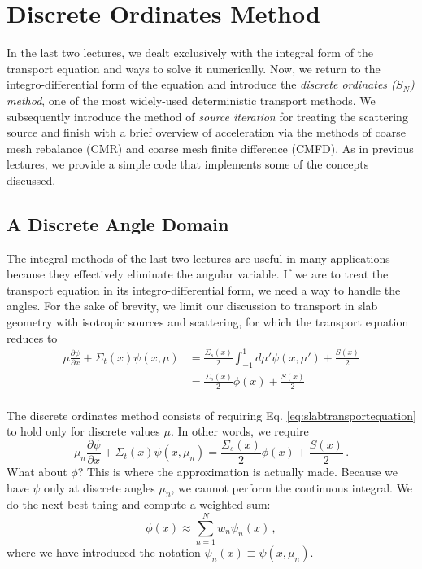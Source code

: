 \chapter{Discrete Ordinates Method}
\label{lec:discreteordinates}

In the last two lectures, we dealt exclusively with the integral form of the transport equation and ways to solve it numerically.  Now, we return to the integro-differential form of the equation and introduce the \textit{discrete ordinates ($S_N$) method}, one of the most widely-used deterministic transport methods.  We subsequently introduce the method of \textit{source iteration} for treating the scattering source and finish with a brief overview of acceleration via the methods of coarse mesh rebalance (CMR) and coarse mesh finite difference (CMFD).  As in previous lectures, we provide a simple code that implements some of the concepts discussed.

\section*{A Discrete Angle Domain}

The integral methods of the last two lectures are useful in many applications because they effectively eliminate the angular variable.  If we are to treat the transport equation in its integro-differential form, we need a way to handle the angles.  For the sake of brevity, we limit our discussion to transport in slab geometry with isotropic sources and scattering, for which the transport equation reduces to
\begin{equation}
\begin{split}
 \mu \frac{\partial \psi}{\partial x} + \Sigma_t(x)\psi(x,\mu) &= \frac{\Sigma_s(x)}{2}\int^1_{-1}d\mu' \psi(x,\mu') + \frac{S(x)}{2} \\
                                                               &= \frac{\Sigma_s(x)}{2}\phi(x) + \frac{S(x)}{2} \\
\end{split}
 \label{eq:slabtransportequation}
\end{equation}

The discrete ordinates method consists of requiring Eq. \ref{eq:slabtransportequation} to hold only for discrete values $\mu$.  In other words, we require
\begin{equation}
 \mu_n \frac{\partial \psi}{\partial x} + \Sigma_t(x)\psi(x,\mu_n) = \frac{\Sigma_s(x)}{2} \phi(x) + \frac{S(x)}{2} \, .
 \label{eq:snequation}
\end{equation}
What about $\phi$?  This is where the approximation is actually made.  Because we have $\psi$ only at discrete angles $\mu_n$, we cannot perform the continuous integral.  We do the next best thing and compute a weighted sum:
\begin{equation}
 \phi(x) \approx \sum^N_{n=1} w_n  \psi_n(x) \, ,
 \label{eq:phiquad}
\end{equation}
where we have introduced the notation $\psi_n(x) \equiv \psi(x,\mu_n)$.  

